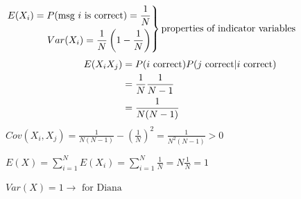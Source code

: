 $
\left.\begin{aligned}
E(X_i)=P(\text{msg $ i $ is correct})=\frac{1}{N}\\
Var(X_i)=\frac{1}{N}\left( 1-\frac{1}{N} \right)
\end{aligned}\right\}\text{properties of indicator variables}
$
\begin{align*}
    E(X_iX_j)
    &=P(\text{$ i $ correct})P(\text{$ j $ correct}|\text{$ i $ correct})\\
    &=\frac{1}{N}\frac{1}{N-1}\\
    &=\frac{1}{N(N-1)}
\end{align*}
$ Cov(X_i,X_j)=\frac{1}{N(N-1)}-\left( \frac{1}{N} \right)^2=
\frac{1}{N^2(N-1)} >0$

$ E(X)=\sum\limits_{i=1}^{N} E(X_i)=\sum\limits_{i=1}^{N}\frac{1}{N}
=N\frac{1}{N}=1 $

$ Var(X)=1\rightarrow\text{ for Diana} $